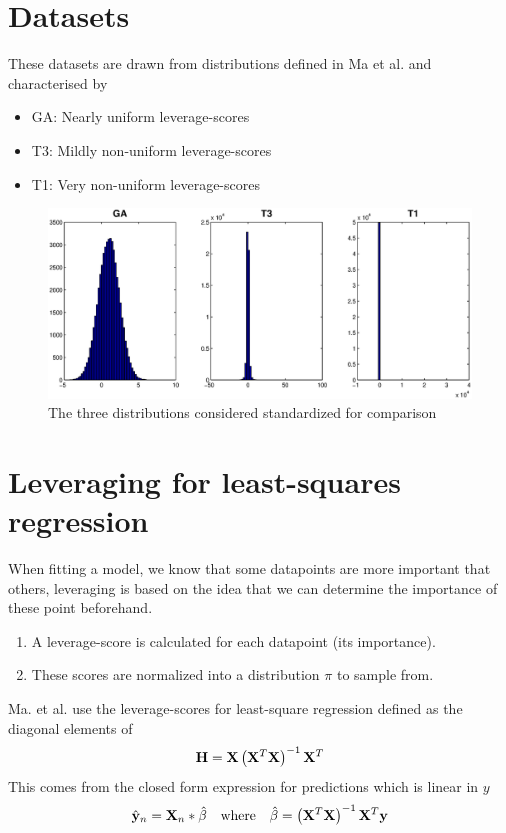 \section{Datasets}
These datasets are drawn from distributions defined in Ma et al. \cite{Ma} and characterised by
\medskip
\begin{itemize}
	\item GA: Nearly uniform leverage-scores
	\item T3: Mildly non-uniform leverage-scores
	\item T1: Very non-uniform leverage-scores
\end{itemize}  
\medskip
\begin{figure}[H]
\centering
\includegraphics[width=\linewidth]{02460_poster_template/images/Data_distributions}
\caption{The three distributions considered standardized for comparison}
\end{figure}
%

\section{Leveraging for least-squares regression}
When fitting a model, we know that some datapoints are more important that others, leveraging is based on the idea that we can determine the importance of these point beforehand.
\medskip
\begin{enumerate}
\item A leverage-score is calculated for each datapoint (its importance).
\item These scores are normalized into a distribution $\pi$ to sample from.
\end{enumerate}
\medskip
Ma. et al. \cite{Ma} use the leverage-scores for least-square regression defined as the diagonal elements of
\begin{equation}
{\bf H} = {\bf X} \left( {\bf X}^T {\bf X} \right)^{-1} {\bf X}^T
 \label{eq:hdist}
\end{equation}
This comes from the closed form expression for predictions which is linear in $y$
\begin{equation*}
	\hat{{\bf y}}_n = {\bf X}_n*\hat{\beta} \quad \text{where} \quad \hat{\beta} = \left( {\bf X}^T {\bf X} \right)^{-1} {\bf X}^T {\bf y} 
\end{equation*}
\vspace{-1.3cm}
